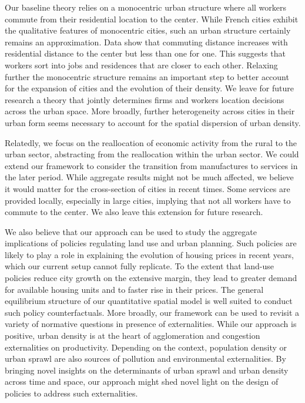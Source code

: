 \documentclass[11pt]{article}
\begin{document}
Our baseline theory relies on a monocentric urban structure where all workers commute from their residential location to the center. While French cities exhibit the qualitative features of monocentric cities, such an urban structure certainly remains an approximation. Data show that commuting distance increases with residential distance to the center but less than one for one. This suggests that workers sort into jobs and residences that are closer to each other. Relaxing further the monocentric structure remains an important step to better account for the expansion of cities and the evolution of their density. We leave for future research a theory that jointly determines firms and workers location decisions across the urban space. More broadly, further heterogeneity across cities in their urban form seems necessary to account for the spatial dispersion of urban density.

Relatedly, we focus on the reallocation of economic activity from the rural to the urban sector, abstracting from the reallocation within the urban sector. We could extend our framework to consider the transition from manufactures to services in the later period. While aggregate results might not be much affected, we believe it would matter for the cross-section of cities in recent times. Some services are provided locally, especially in large cities, implying that not all workers have to commute to the center. We also leave this extension for future research. 


We also believe that our approach can be used to study the aggregate implications of policies regulating land use and urban planning. Such policies are likely to play a role in explaining the evolution of housing prices in recent years, which our current setup cannot fully replicate. To the extent that land-use policies reduce city growth on the extensive margin, they lead to greater demand for available housing units and to faster rise in their prices. The general equilibrium structure of our quantitative spatial model is well suited to conduct such policy counterfactuals. More broadly, our framework can be used to revisit a variety of normative questions in presence of externalities. While our approach is positive, urban density is at the heart of agglomeration and congestion externalities on productivity. Depending on the context, population density or urban sprawl are also sources of pollution and environmental externalities. By bringing novel insights on the determinants of urban sprawl and urban density across time and space, our approach might shed novel light on the design of policies to address such externalities.

\pagebreak


\end{document}
